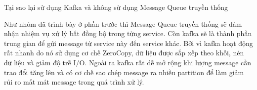 \begin{itemize}
            Tại sao lại sử dụng Kafka và không sử dụng Message Queue truyền thống
            
            Như nhóm đã trình bày ở phần trước thì Message Queue truyền thống sẽ đảm nhận nhiệm vụ xử lý bất đồng bộ trong từng service. Còn kafka sẽ là thành phần trung gian để gửi message từ service này đến service khác. Bởi vì kafka hoạt động rất nhanh do nó sử dụng cơ chế ZeroCopy, dữ liệu được sắp xếp theo khối, nén dữ liệu và giảm độ trễ I/O. Ngoài ra kafka rất dễ mở rộng khi lượng message cần trao đổi tăng lên và có cơ chế sao chép message ra nhiều partition để làm giảm rủi ro mất mát message trong quá trình xử lý.
		\end{itemize}